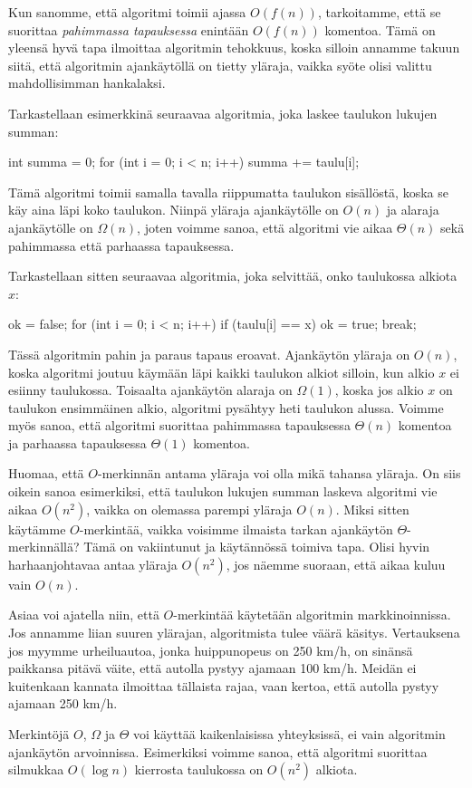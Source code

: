 Kun sanomme, että algoritmi toimii ajassa $O(f(n))$, tarkoitamme, että se suorittaa
\emph{pahimmassa tapauksessa} enintään $O(f(n))$ komentoa.
Tämä on yleensä hyvä tapa ilmoittaa algoritmin tehokkuus,
koska silloin annamme takuun siitä, että algoritmin ajankäytöllä on tietty yläraja,
vaikka syöte olisi valittu mahdollisimman hankalaksi.

Tarkastellaan esimerkkinä seuraavaa algoritmia, joka laskee
taulukon lukujen summan:

\begin{code}
int summa = 0;
for (int i = 0; i < n; i++) {
    summa += taulu[i];
}
\end{code}

Tämä algoritmi toimii samalla tavalla riippumatta taulukon sisällöstä,
koska se käy aina läpi koko taulukon.
Niinpä yläraja ajankäytölle on $O(n)$ ja alaraja ajankäytölle on $\Omega(n)$,
joten voimme sanoa, että algoritmi vie aikaa $\Theta(n)$ sekä pahimmassa
että parhaassa tapauksessa.

Tarkastellaan sitten seuraavaa algoritmia, joka selvittää,
onko taulukossa alkiota $x$:

\begin{code}
ok = false;
for (int i = 0; i < n; i++) {
    if (taulu[i] == x) {
        ok = true;
        break;
    }
}
\end{code}

Tässä algoritmin pahin ja paraus tapaus eroavat.
Ajankäytön yläraja on $O(n)$, koska algoritmi joutuu käymään
läpi kaikki taulukon alkiot silloin, kun alkio $x$
ei esiinny taulukossa.
Toisaalta ajankäytön alaraja on $\Omega(1)$,
koska jos alkio $x$ on taulukon ensimmäinen alkio,
algoritmi pysähtyy heti taulukon alussa.
Voimme myös sanoa, että algoritmi suorittaa pahimmassa
tapauksessa $\Theta(n)$ komentoa ja parhaassa tapauksessa
$\Theta(1)$ komentoa.

Huomaa, että $O$-merkinnän antama yläraja voi olla mikä tahansa yläraja.
On siis oikein sanoa esimerkiksi, että taulukon lukujen summan
laskeva algoritmi vie aikaa $O(n^2)$, vaikka on olemassa parempi yläraja $O(n)$.
Miksi sitten käytämme $O$-merkintää, vaikka voisimme ilmaista tarkan
ajankäytön $\Theta$-merkinnällä?
Tämä on vakiintunut ja käytännössä toimiva tapa.
Olisi hyvin harhaanjohtavaa antaa yläraja $O(n^2)$,
jos näemme suoraan, että aikaa kuluu vain $O(n)$.

Asiaa voi ajatella niin, että $O$-merkintää käytetään algoritmin
markkinoinnissa. Jos annamme liian suuren ylärajan, algoritmista
tulee väärä käsitys.
Vertauksena jos myymme urheiluautoa, jonka huippunopeus on 250 km/h,
on sinänsä paikkansa pitävä väite, että autolla pystyy ajamaan 100 km/h.
Meidän ei kuitenkaan kannata ilmoittaa tällaista rajaa,
vaan kertoa, että autolla pystyy ajamaan 250 km/h.

Merkintöjä $O$, $\Omega$ ja $\Theta$ voi käyttää
kaikenlaisissa yhteyksissä, ei vain algoritmin ajankäytön arvoinnissa.
Esimerkiksi voimme sanoa, että algoritmi suorittaa silmukkaa $O(\log n)$ kierrosta
taulukossa on $O(n^2)$ alkiota.
